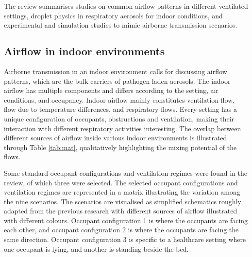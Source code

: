 \documentclass[a4paper,12pt]{elsarticle}
\begin{document}
The review summarises studies on common airflow patterns in different ventilated settings, droplet physics in respiratory aerosols for indoor conditions, and experimental and simulation studies to mimic airborne transmission scenarios.

\subsection{Airflow in indoor environments}

Airborne transmission in an indoor environment calls for discussing airflow patterns, which are the bulk carriers of pathogen-laden aerosols. The indoor airflow has multiple components and differs according to the setting, air conditions, and occupancy. Indoor airflow mainly constitutes ventilation flow, flow due to temperature differences, and respiratory flows. Every setting has a unique configuration of occupants, obstructions and ventilation, making their interaction with different respiratory activities interesting. The overlap between different sources of airflow inside various indoor environments is illustrated through Table \ref{tab:mat}, qualitatively highlighting the mixing potential of the flows.

Some standard occupant configurations and ventilation regimes were found in the review, of which three were selected. The selected occupant configurations and ventilation regimes are represented in a matrix illustrating the variation among the nine scenarios. The scenarios are visualised as simplified schematics roughly adapted from the previous research with different sources of airflow illustrated with different colours. Occupant configuration 1 is where the occupants are facing each other, and occupant configuration 2 is where the occupants are facing the same direction. Occupant configuration 3 is specific to a healthcare setting where one occupant is lying, and another is standing beside the bed.
\end{document}
